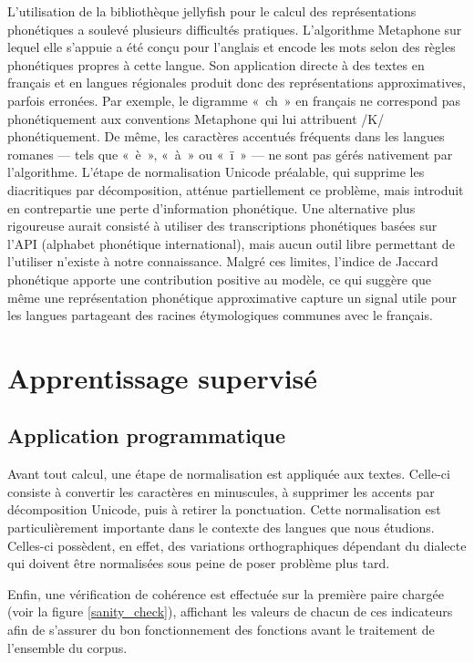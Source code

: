 L'utilisation de la bibliothèque jellyfish pour le calcul des représentations phonétiques a soulevé plusieurs difficultés pratiques.
L'algorithme Metaphone sur lequel elle s'appuie a été conçu pour l'anglais et encode les mots selon des règles phonétiques propres à cette langue.
Son application directe à des textes en français et en langues régionales produit donc des représentations approximatives, parfois
erronées. Par exemple,
le digramme «~ch~» en français ne correspond pas phonétiquement aux conventions Metaphone qui lui attribuent /K/ phonétiquement.
De même, les caractères accentués fréquents dans les langues romanes — tels que «~è~», «~à~» ou «~ï~» — ne sont pas gérés nativement par
l'algorithme. L'étape de normalisation Unicode préalable, qui supprime les diacritiques par décomposition, atténue partiellement ce problème, mais
introduit en contrepartie une perte d'information phonétique. Une alternative plus rigoureuse aurait consisté à utiliser des transcriptions
phonétiques basées sur l'API (alphabet phonétique international), mais aucun outil libre permettant de l'utiliser n'existe à notre connaissance.
Malgré ces limites, l'indice de Jaccard phonétique apporte une contribution
positive au modèle, ce qui suggère que même une représentation phonétique approximative capture un signal utile pour les langues partageant des
racines étymologiques communes avec le français.

\section{Apprentissage supervisé}

\subsection{Application programmatique}

Avant tout calcul, une étape de normalisation est appliquée aux textes. Celle-ci consiste à convertir les 
caractères en minuscules, à supprimer les accents par décomposition Unicode, puis à retirer la ponctuation. 
Cette normalisation est particulièrement importante dans le contexte des langues que nous étudions.
Celles-ci possèdent, en effet, des variations orthographiques dépendant du dialecte qui doivent être normalisées
sous peine de poser problème plus tard.

Enfin, une vérification de cohérence est effectuée sur la première paire chargée (voir la figure \ref{sanity_check}), 
affichant les valeurs de chacun de ces indicateurs afin de s'assurer du bon fonctionnement des fonctions 
avant le traitement de l'ensemble du corpus.

